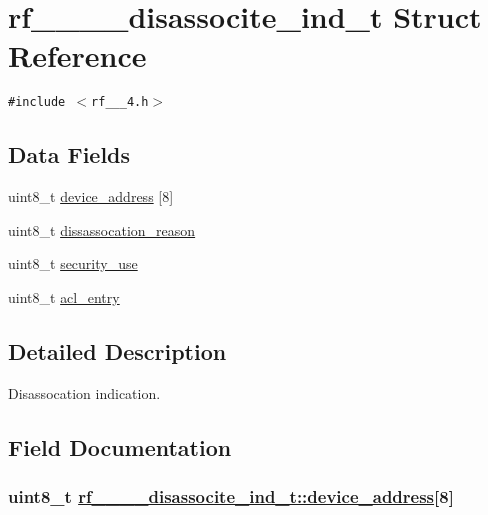 \hypertarget{structrf__802__15__4__disassocite__ind__t}{
\section{rf\_\_\_\_\-disassocite\_\-ind\_\-t Struct Reference}
\label{structrf__802__15__4__disassocite__ind__t}
}
{\tt \#include $<$rf\_\_\_\-4.h$>$}

\subsection*{Data Fields}
\begin{CompactItemize}
\item 
uint8\_\-t \hyperlink{structrf__802__15__4__disassocite__ind__t_4c05ddc66f34dbd413ffede2dff8af78}{device\_\-address} \mbox{[}8\mbox{]}
\item 
uint8\_\-t \hyperlink{structrf__802__15__4__disassocite__ind__t_3e3ee684fbf3997039fd244e72746c91}{dissassocation\_\-reason}
\item 
uint8\_\-t \hyperlink{structrf__802__15__4__disassocite__ind__t_9cc973eea95551ccb75254d9eb3fd60a}{security\_\-use}
\item 
uint8\_\-t \hyperlink{structrf__802__15__4__disassocite__ind__t_8341fae36b6445ff2ffde3436eddd5f2}{acl\_\-entry}
\end{CompactItemize}


\subsection{Detailed Description}
Disassocation indication. 



\subsection{Field Documentation}
\hypertarget{structrf__802__15__4__disassocite__ind__t_4c05ddc66f34dbd413ffede2dff8af78}{
\subsubsection[device\_\-address]{\setlength{\rightskip}{0pt plus 5cm}uint8\_\-t \hyperlink{structrf__802__15__4__disassocite__ind__t_4c05ddc66f34dbd413ffede2dff8af78}{rf\_\_\_\_\-disassocite\_\-ind\_\-t::device\_\-address}\mbox{[}8\mbox{]}}}
\label{structrf__802__15__4__disassocite__ind__t_4c05ddc66f34dbd413ffede2dff8af78}


